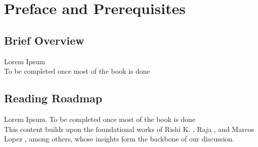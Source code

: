 \section{Preface and Prerequisites}

\subsection{Brief Overview}

Lorem Ipsum\\
To be completed once most of the book is done


\subsection{Reading Roadmap}

Lorem Ipsum. To be completed once most of the book is done\\

This content builds upon the foundational works of Rishi K. \cite{rishi_2013}, Raja \cite{velu_2020}, and Marcos Lopez \cite{marcos_2018}, among others, whose insights form the backbone of our discussion.

\newpage



\newpage


